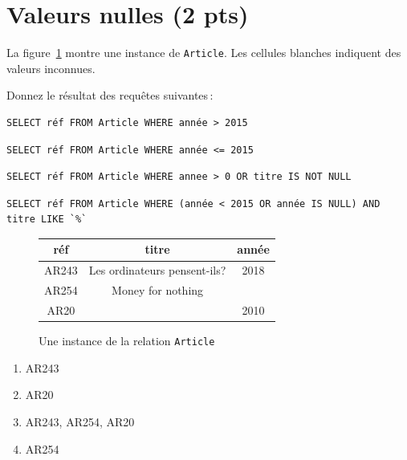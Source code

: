   
\section{Valeurs nulles ({\bf 2 pts})}

La figure~\ref{ex-relation} montre une instance de {\tt Article}. Les cellules
blanches indiquent des valeurs inconnues.

Donnez le résultat des
requêtes suivantes\,:

\begin{small}
\begin{verbatim}
SELECT réf FROM Article WHERE année > 2015
\end{verbatim}

\begin{verbatim}
SELECT réf FROM Article WHERE année <= 2015
\end{verbatim}

\begin{verbatim}
SELECT réf FROM Article WHERE annee > 0 OR titre IS NOT NULL
\end{verbatim}



\begin{verbatim}
SELECT réf FROM Article WHERE (année < 2015 OR année IS NULL) AND titre LIKE `%`
\end{verbatim}
\end{small}

\begin{figure}[ht]
\begin{center}
\begin{tabular}{c|c|c}
réf  & titre & année \\\hline
AR243 & Les ordinateurs pensent-ils? & 2018  \\\hline 
AR254 & Money for nothing &  \\\hline
AR20 &  & 2010\\\hline
\end{tabular}
\end{center}
\caption{Une instance de la relation {\tt Article}}
\label{ex-relation}
\end{figure}


\begin{solution}
   \begin{enumerate}
      \item AR243
       \item AR20
       \item AR243, AR254, AR20
         \item AR254
    \end{enumerate}
\end{solution}


